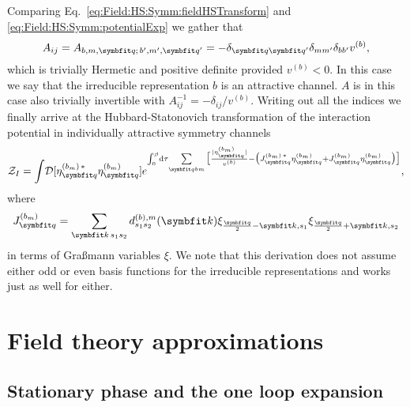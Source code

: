 Comparing Eq.~\eqref{eq:Field:HS:Symm:fieldHSTransform} and \eqref{eq:Field:HS:Symm:potentialExp} we gather that
\begin{equation}
    \label{eq:Field:HS:Symm:Matrix}
    A_{ij} = A_{b,m,\v{q};\,b',m',\v{q}'} = -\delta_{\v{q}\v{q}'}\delta_{mm'}\delta_{bb'}v^{(b)},
\end{equation}
which is trivially Hermetic and positive definite provided $v^{(b)}<0$. In this case we say that the irreducible representation $b$ is an
attractive channel. $A$ is in this case also trivially invertible with $A_{ij}^{-1} = -\delta_{ij}/v^{(b)}$.
Writing out all the indices we finally arrive at the Hubbard-Statonovich transformation of the interaction potential in individually
attractive symmetry channels
\begin{equation}
    \label{eq:Field:HS:Symm:HSTransformedPotentialExp}
    \mathcal{Z}_I = \int\!\mathcal{D}[\eta_\v{q}^{(b_m)\,\ast}\eta_\v{q}^{(b_m)}]e^{\int_0^\beta\!\mathrm{d}\tau\!\sum\limits_{\v{q}bm}\big[\frac{|\eta_\v{q}^{(b_m)}|}{v^{(b)}} - \big(J_\v{q}^{(b_m)\,\ast}\eta_\v{q}^{(b_m)} + J_\v{q}^{(b_m)}\eta_\v{q}^{(b_m)}\big)\big]},
\end{equation}
where
\begin{equation}
    \label{eq:Field:HS:Symm:JRedef}
    J^{(b_m)}_\v{q} = \sum_{\v{k}\,s_1s_2}d_{s_1s_2}^{(b),m}(\v{k})\xi_{\frac{\v{q}}{2}-\v{k},s_1}\xi_{\frac{\v{q}}{2}+\v{k},s_2}
\end{equation}
in terms of Gra\ss mann variables $\xi$. We note that this derivation does not assume either odd or even basis functions for the
irreducible representations and works just as well for either.

\section{Field theory approximations}

\subsection{Stationary phase and the one loop expansion}

